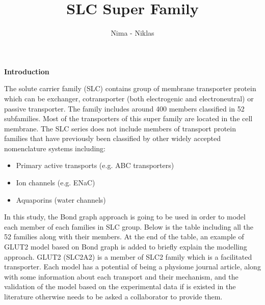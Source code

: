 \documentclass[12pt]{report}
\title{SLC Super Family}
\author{Nima - Niklas}
\begin{document}
\maketitle
\textbf{Introduction}

The solute carrier family (SLC) contains group of membrane transporter protein which can be exchanger, cotransporter (both electrogenic and electroneutral) or passive transporter. The family includes around 400 members classified in 52 subfamilies. Most of the transporters of this super family are located in the cell membrane. 
The SLC series does not include members of transport protein families that have previously been classified by other widely accepted nomenclature systems including:
\begin{itemize}
    \item Primary active transports (e.g. ABC transporters)
    \item Ion channels (e.g. ENaC)
    \item Aquaporins (water channels)
\end{itemize}

In this study, the Bond graph approach is going to be used in order to model each member of each families in SLC group. Below is the table including all the 52 families along with their members. At the end of the table, an example of GLUT2 model based on Bond graph is added to briefly explain the modelling approach. GLUT2 (SLC2A2) is a member of SLC2 family which is a facilitated transporter.
Each model has a potential of being a physiome journal article, along with some information about each transport and their mechanism, and the validation of the model based on the experimental data if is existed in the literature otherwise needs to be asked a collaborator to provide them. 




\end{document}
